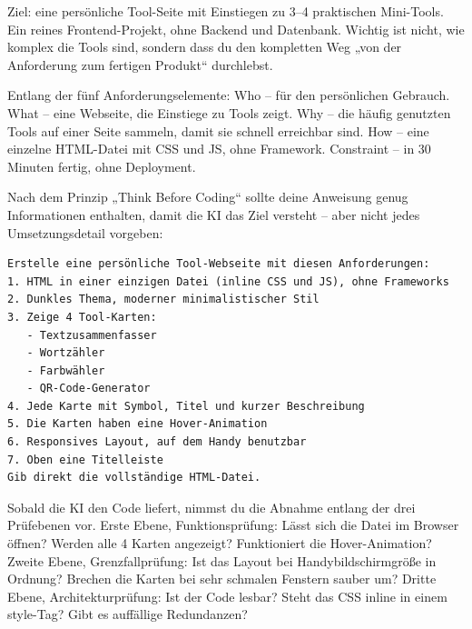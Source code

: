 



Ziel: eine persönliche Tool-Seite mit Einstiegen zu 3–4 praktischen Mini-Tools. Ein reines Frontend-Projekt, ohne Backend und Datenbank. Wichtig ist nicht, wie komplex die Tools sind, sondern dass du den kompletten Weg „von der Anforderung zum fertigen Produkt“ durchlebst.

Entlang der fünf Anforderungselemente: Who – für den persönlichen Gebrauch. What – eine Webseite, die Einstiege zu Tools zeigt. Why – die häufig genutzten Tools auf einer Seite sammeln, damit sie schnell erreichbar sind. How – eine einzelne HTML-Datei mit CSS und JS, ohne Framework. Constraint – in 30 Minuten fertig, ohne Deployment.


Nach dem Prinzip „Think Before Coding“ sollte deine Anweisung genug Informationen enthalten, damit die KI das Ziel versteht – aber nicht jedes Umsetzungsdetail vorgeben:

\begin{lstlisting}
Erstelle eine persönliche Tool-Webseite mit diesen Anforderungen:
1. HTML in einer einzigen Datei (inline CSS und JS), ohne Frameworks
2. Dunkles Thema, moderner minimalistischer Stil
3. Zeige 4 Tool-Karten:
   - Textzusammenfasser
   - Wortzähler
   - Farbwähler
   - QR-Code-Generator
4. Jede Karte mit Symbol, Titel und kurzer Beschreibung
5. Die Karten haben eine Hover-Animation
6. Responsives Layout, auf dem Handy benutzbar
7. Oben eine Titelleiste
Gib direkt die vollständige HTML-Datei.
\end{lstlisting}


Sobald die KI den Code liefert, nimmst du die Abnahme entlang der drei Prüfebenen vor. Erste Ebene, Funktionsprüfung: Lässt sich die Datei im Browser öffnen? Werden alle 4 Karten angezeigt? Funktioniert die Hover-Animation? Zweite Ebene, Grenzfallprüfung: Ist das Layout bei Handybildschirmgröße in Ordnung? Brechen die Karten bei sehr schmalen Fenstern sauber um? Dritte Ebene, Architekturprüfung: Ist der Code lesbar? Steht das CSS inline in einem style-Tag? Gibt es auffällige Redundanzen?

